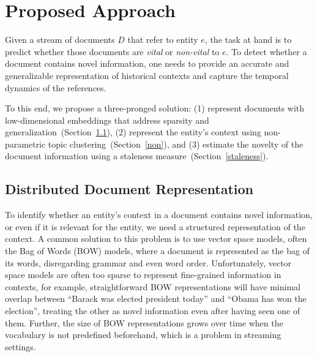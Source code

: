 \documentclass{article}
\begin{document}
\section{Proposed Approach}
\label{approach}

Given a stream of documents $D$ that refer to entity $e$, the task at hand is to predict whether those documents are \emph{vital} or \emph{non-vital} to $e$. 
To detect whether a document contains novel information, one needs to provide an accurate and generalizable representation of historical contexts and capture the temporal dynamics of the references.

To this end, we propose a three-pronged solution:
(1) represent documents with low-dimensional embeddings that address sparsity and generalization~(Section~\ref{docwordemb}), 
(2) represent the entity's context using non-parametric topic clustering~(Section~\ref{non}), and 
(3) estimate the novelty of the document information using a staleness measure~(Section~\ref{staleness}).


\subsection{Distributed Document Representation}
\label{docwordemb}

To identify whether an entity's context in a document contains novel information, or even if it is relevant for the entity, we need a structured representation of the context. %
A common solution to this problem is to use vector space models, often the Bag of Words (BOW) models, where a document is represented as the bag of its words, disregarding grammar and even word order. 
Unfortunately, vector space models are often too sparse to represent fine-grained information in contexts, for example, straightforward BOW representations will have minimal overlap between ``Barack was elected president today'' and ``Obama has won the election'', treating the other as novel information even after having seen one of them.
Further, the size of BOW representations grows over time when the vocabulary is not predefined beforehand, which is a problem in streaming settings.
\end{document}
